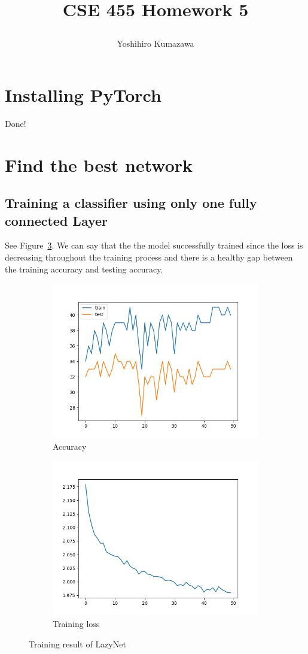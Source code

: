 \documentclass[12pt]{article}
\title{
  \vspace{-2cm}
  CSE 455 Homework 5 \\
  \author{Yoshihiro Kumazawa}
}
\begin{document}
\maketitle

\section{Installing PyTorch}
Done!

\section{Find the best network}
\subsection{Training a classifier using only one fully connected Layer}
See Figure~\ref{fig:2_1}. We can say that the the model successfully trained since the loss is decreasing throughout the training process and there is a healthy gap between the training accuracy and testing accuracy.
\begin{figure}
  \centering
  \begin{subfigure}{.5\textwidth}
    \centering
    \includegraphics[width=.8\linewidth]{accuracies_2_1.png}
    \caption{Accuracy}
    \label{fig:2_1_sub1}
  \end{subfigure}%
  \begin{subfigure}{.5\textwidth}
    \centering
    \includegraphics[width=.8\linewidth]{loss_2_1.png}
    \caption{Training loss}
    \label{fig:2_1_sub2}
  \end{subfigure}
  \caption{Training result of LazyNet}
  \label{fig:2_1}
\end{figure}
\end{document}
